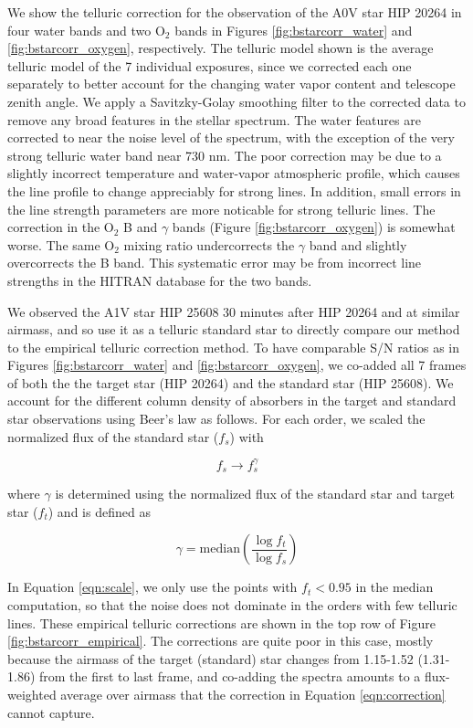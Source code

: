 We show the telluric correction for the observation of the A0V star HIP 20264 in four water bands and two $\mathrm{O_2}$ bands in Figures \ref{fig:bstarcorr_water} and \ref{fig:bstarcorr_oxygen}, respectively. The telluric model shown is the average telluric model of the 7 individual exposures, since we corrected each one separately to better account for the changing water vapor content and telescope zenith angle. We apply a Savitzky-Golay smoothing filter to the corrected data to remove any broad features in the stellar spectrum. The water features are corrected to near the noise level of the spectrum, with the exception of the very strong telluric water band near 730 nm. The poor correction may be due to a slightly incorrect temperature and water-vapor atmospheric profile, which causes the line profile to change appreciably for strong lines. In addition, small errors in the line strength parameters are more noticable for strong telluric lines. The correction in the $\mathrm{O_2}$ B and $\gamma$ bands (Figure \ref{fig:bstarcorr_oxygen}) is somewhat worse. The same $\mathrm{O_2}$ mixing ratio undercorrects the $\gamma$ band and slightly overcorrects the B band. This systematic error may be from incorrect line strengths in the HITRAN database for the two bands. 

We observed the A1V star HIP 25608 30 minutes after HIP 20264 and at similar airmass, and so use it as a telluric standard star to directly compare our method to the empirical telluric correction method. To have comparable S/N ratios as in Figures \ref{fig:bstarcorr_water} and \ref{fig:bstarcorr_oxygen}, we co-added all 7 frames of both the the target star (HIP 20264) and the standard star (HIP 25608). We account for the different column density of absorbers in the target and standard star observations using Beer's law \citep{Beer1852} as follows. For each order, we scaled the normalized flux of the standard star ($f_s$) with

\begin{equation}
f_s \rightarrow f_s^{\gamma}
\label{eqn:correction}
\end{equation}

where $\gamma$ is determined using the normalized flux of the standard star and target star ($f_t$) and is defined as

\begin{equation}
\gamma = \text{median} \left( \frac{\log{f_t}}{\log{f_s}} \right)
\label{eqn:scale}
\end{equation}

In Equation \ref{eqn:scale}, we only use the points with $f_t < 0.95$ in the median computation, so that the noise does not dominate in the orders with few telluric lines. These empirical telluric corrections are shown in the top row of Figure \ref{fig:bstarcorr_empirical}. The corrections are quite poor in this case, mostly because the airmass of the target (standard) star changes from 1.15-1.52 (1.31-1.86) from the first to last frame, and co-adding the spectra amounts to a flux-weighted average over airmass that the correction in Equation \ref{eqn:correction} cannot capture. 

